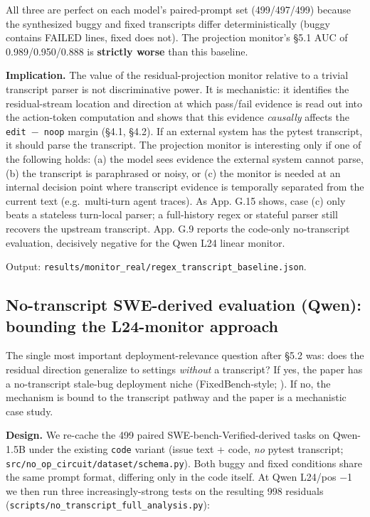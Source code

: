 \documentclass[
  11pt,
  a4paper]{article}
\begin{document}
All three are perfect on each model's paired-prompt set (499/497/499)
because the synthesized buggy and fixed transcripts differ
deterministically (buggy contains FAILED lines, fixed does not). The
projection monitor's \S{}5.1 AUC of 0.989/0.950/0.888 is \textbf{strictly
worse} than this baseline.

\textbf{Implication.} The value of the residual-projection monitor
relative to a trivial transcript parser is not discriminative power. It
is mechanistic: it identifies the residual-stream location and direction
at which pass/fail evidence is read out into the action-token
computation and shows that this evidence \emph{causally} affects the
\texttt{edit\ \ensuremath{-}\ noop} margin (\S{}4.1, \S{}4.2). If an external system has
the pytest transcript, it should parse the transcript. The projection
monitor is interesting only if one of the following holds: (a) the model
sees evidence the external system cannot parse, (b) the transcript is
paraphrased or noisy, or (c) the monitor is needed at an internal
decision point where transcript evidence is temporally separated from
the current text (e.g.~multi-turn agent traces). As App. G.15 shows,
case (c) only beats a stateless turn-local parser; a full-history regex
or stateful parser still recovers the upstream transcript. App. G.9
reports the code-only no-transcript evaluation, decisively negative for
the Qwen L24 linear monitor.

Output: \texttt{results/monitor\_real/regex\_transcript\_baseline.json}.

\subsection{No-transcript SWE-derived evaluation (Qwen): bounding the
L24-monitor
approach}\label{no-transcript-swe-derived-evaluation-qwen-bounding-the-l24-monitor-approach}

The single most important deployment-relevance question after \S{}5.2 was:
does the residual direction generalize to settings \emph{without} a
transcript? If yes, the paper has a no-transcript stale-bug deployment
niche (FixedBench-style; \citet{fixedbench2025}). If no, the mechanism
is bound to the transcript pathway and the paper is a mechanistic case
study.

\textbf{Design.} We re-cache the 499 paired SWE-bench-Verified-derived
tasks on Qwen-1.5B under the existing \texttt{code} variant (issue text
+ code, \emph{no} pytest transcript;
\texttt{src/no\_op\_circuit/dataset/schema.py}). Both buggy and fixed
conditions share the same prompt format, differing only in the code
itself. At Qwen L24/pos \ensuremath{-}1 we then run three increasingly-strong tests
on the resulting 998 residuals
(\texttt{scripts/no\_transcript\_full\_analysis.py}):
\end{document}
